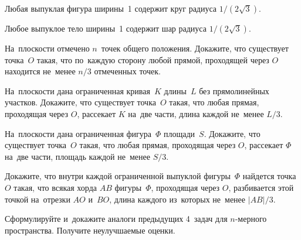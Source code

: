 \begin{problems}
\item{}
Любая выпуклая фигура ширины~1 содержит круг радиуса $1 / (2 \sqrt{3})$.

\item{}
Любое выпуклое тело ширины~1 содержит шар радиуса $1 / (2 \sqrt{3})$.

\item
На~плоскости отмечено $n$~точек общего положения.
Докажите, что существует точка~$O$ такая, что по~каждую сторону любой прямой,
проходящей через $O$ находится не~менее $n / 3$ отмеченных точек.

\item
На~плоскости дана ограниченная кривая~$K$ длины~$L$ без прямолинейных участков.
Докажите, что существует точка~$O$ такая, что любая прямая, проходящая
через $O$, рассекает $K$ на~две части, длина каждой не~менее $L / 3$.

\item
На~плоскости дана ограниченная фигура~$\Phi$ площади~$S$.
Докажите, что существует точка~$O$ такая, что любая прямая, проходящая
через $O$, рассекает $\Phi$ на~две части, площадь каждой не~менее $S / 3$.

\item
Докажите, что внутри каждой ограниченной выпуклой фигуры~$\Phi$ найдется
точка~$O$ такая, что всякая хорда $AB$ фигуры~$\Phi$, проходящая через $O$,
разбивается этой точкой на~отрезки $AO$ и~$BO$, длина каждого из~которых
не~менее $\lvert AB \rvert / 3$.

\item
Сформулируйте и~докажите аналоги предыдущих 4~задач для $n$-мерного
пространства.
Получите неулучшаемые оценки.

\end{problems}

